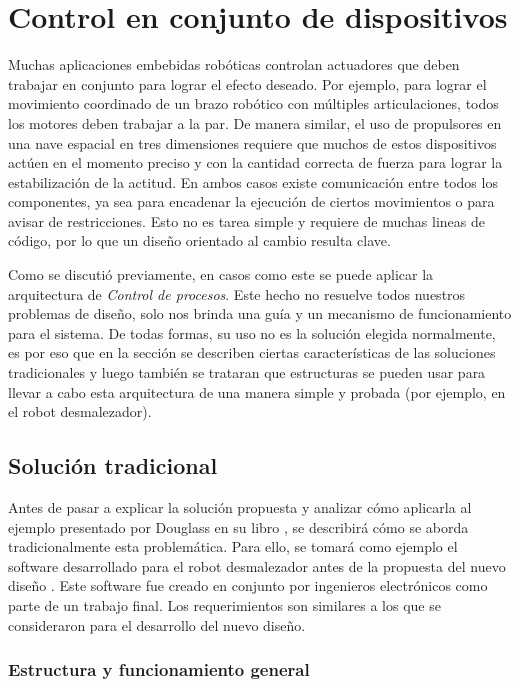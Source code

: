 \section{Control en conjunto de dispositivos}
Muchas aplicaciones embebidas robóticas controlan \gls{actuadores} que deben trabajar en conjunto para lograr el efecto deseado. Por ejemplo, para lograr el movimiento coordinado de un brazo robótico con múltiples articulaciones, todos los motores deben trabajar a la par. De manera similar, el uso de propulsores en una nave espacial en tres dimensiones requiere que muchos de estos dispositivos actúen en el momento preciso y con la cantidad correcta de fuerza para lograr la estabilización de la actitud. En ambos casos existe comunicación entre todos los componentes, ya sea para encadenar la ejecución de ciertos movimientos o para avisar de restricciones. Esto no es tarea simple y requiere de muchas lineas de código, por lo que un diseño orientado al cambio resulta clave.

Como se discutió previamente, en casos como este se puede aplicar la arquitectura de \textit{Control de procesos}. Este hecho no resuelve todos nuestros problemas de diseño, solo nos brinda una guía y un mecanismo de funcionamiento para el sistema. De todas formas, su uso no es la solución elegida normalmente, es por eso que en la sección se describen ciertas características de las soluciones tradicionales y luego también se trataran que estructuras se pueden usar para llevar a cabo esta arquitectura de una manera simple y probada (por ejemplo, en el robot desmalezador).

\subsection*{Solución tradicional}

Antes de pasar a explicar la solución propuesta y analizar cómo aplicarla al ejemplo presentado por Douglass en su libro \cite{douglass}, se describirá cómo se aborda tradicionalmente esta problemática. Para ello, se tomará como ejemplo el software desarrollado para el robot desmalezador antes de la propuesta del nuevo diseño \cite{paperPomponio}. Este software fue creado en conjunto por ingenieros electrónicos como parte de un trabajo final. Los requerimientos son similares a los que se consideraron para el desarrollo del nuevo diseño.

\subsubsection*{Estructura y funcionamiento general}

